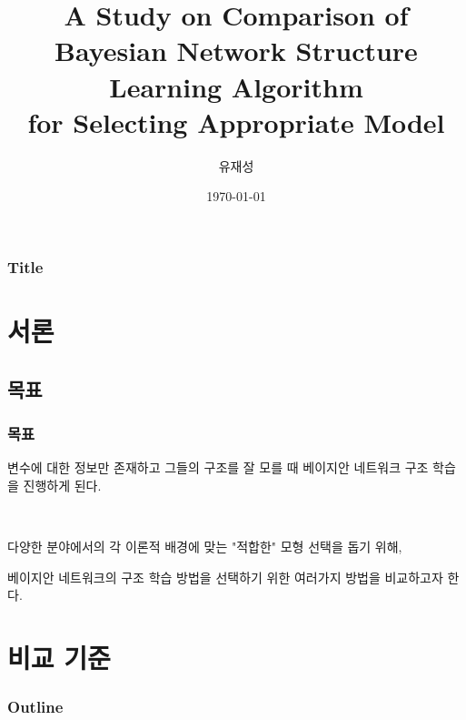 \documentclass{beamer}
\title[Title]{A Study on Comparison of\\ Bayesian Network Structure Learning Algorithm\\ for Selecting Appropriate Model}
\author[Joe]{유재성}
\institute[]{Dept. of Statistics}
\date{\today}
\begin{document}



\begin{frame}
\frametitle{Title}
{\scriptsize{}
	\tableofcontents
}
\end{frame}



\section{서론}

\subsection{목표}
\begin{frame}
\frametitle{목표}
{\scriptsize{}
	변수에 대한 정보만 존재하고 그들의 구조를 잘 모를 때 베이지안 네트워크 구조 학습을 진행하게 된다.
	
	{}\
	
	다양한 분야에서의 각 이론적 배경에 맞는 "적합한" 모형 선택을 돕기 위해,
	
	베이지안 네트워크의 구조 학습 방법을 선택하기 위한 여러가지 방법을 비교하고자 한다.
}
\end{frame}



\section{비교 기준}
\begin{frame}
\frametitle{Outline}
{\scriptsize{}
	\tableofcontents[currentsection]
}
\end{frame}
\end{document}
